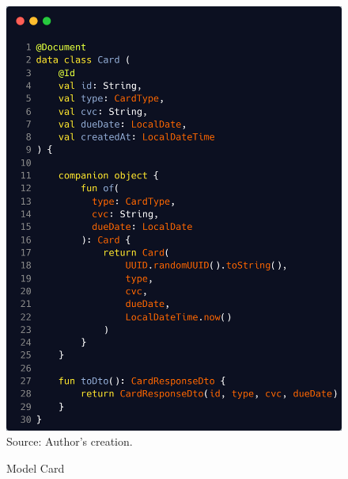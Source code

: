 \begin{figure}[H]
	\centering
	\caption{Model Card}
	\includegraphics[width=1\linewidth]{figures/card}
	\label{fig:card}
	\footnotesize Source: Author's creation.
\end{figure}

